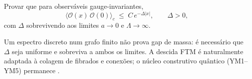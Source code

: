 \documentclass[11pt,a4paper]{article}
\begin{document}
\begin{obligation}\label{ob:YM5}
Provar que para observáveis gauge-invariantes,
\[
  \langle\mathcal O(x)\,\mathcal O(0)\rangle_c
  \;\le\; C\,e^{-\Delta|x|},
  \qquad \Delta>0,
\]
com $\Delta$ sobrevivendo aos limites $a\to0$ e $\Lambda\to\infty$.
\end{obligation}

\begin{remark}
Um espectro discreto num grafo finito não prova gap de massa:
é necessário que $\Delta$ seja uniforme e sobreviva a ambos os limites.
A descida FTM é naturalmente adaptada à colagem de fibrados e conexões;
o núcleo construtivo quântico (YM1–YM5) permanece \OPEN.
\end{remark}

\end{document}
